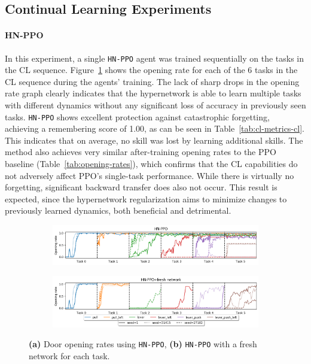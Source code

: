 \documentclass[dvipsnames]{article} %
\newcommand{\commentOLD}[1]{}
\newcommand{\jhOLD}[1] {\commentOLD{{\color{RawSienna} JH: #1}}}           %
\begin{document}
\subsection{Continual Learning Experiments}
\paragraph{HN-PPO}
\label{chap:hnppo}
In this experiment, a single \texttt{HN-PPO} agent was trained sequentially on the tasks in the CL sequence. Figure~\ref{fig:hnppo_graph} shows the opening rate for each of the 6 tasks in the CL sequence during the agents' training. The lack of sharp drops in the opening rate graph clearly indicates that the hypernetwork is able to learn multiple tasks with different dynamics without any significant loss of accuracy in previously seen tasks.  \texttt{HN-PPO} shows excellent protection against catastrophic forgetting, achieving a remembering score of 1.00, as can be seen in Table~\ref{tab:cl-metrics-cl}. This indicates that on average, no skill was lost by learning additional skills. The method also achieves very similar after-training opening rates to the PPO baseline (Table~\ref{tab:opening-rates}), which confirms that the CL capabilities do not adversely affect PPO's single-task performance. While there is virtually no forgetting, significant backward transfer does also not occur. This result is expected, since the hypernetwork regularization aims to minimize changes to previously learned dynamics, both beneficial and detrimental.

\begin{figure}[tb]
\begin{subfigure}{\linewidth}
    \includegraphics[width=1.0\linewidth]{images/cl_timeseries_series5_config.png}
    \caption{}
    \label{fig:hnppo_graph}
\end{subfigure}
\begin{subfigure}{\linewidth}
    \includegraphics[width=1.0\linewidth]{images/cl_timeseries_series6_config.png}
    \caption{}
    \label{fig:hnppo_graph_fresh}
\end{subfigure}
\caption{\textbf{(a)} Door opening rates using \texttt{HN-PPO}, \textbf{(b)} \texttt{HN-PPO} with a fresh network for each task.\jhOLD{the data for this plot (a) are still incomplete, right?}}
\end{figure}
\end{document}
